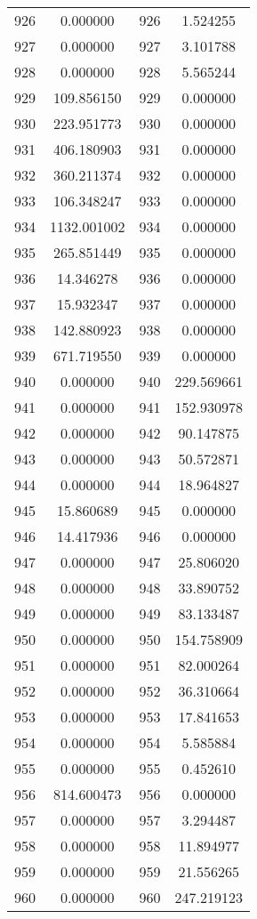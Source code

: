 \documentclass[12pt]{article}
\begin{document}
\begin{longtable}{@{}cccc@{}}
926 & 0.000000 & 926 & 1.524255 \\
927 & 0.000000 & 927 & 3.101788 \\
928 & 0.000000 & 928 & 5.565244 \\
929 & 109.856150 & 929 & 0.000000 \\
930 & 223.951773 & 930 & 0.000000 \\
931 & 406.180903 & 931 & 0.000000 \\
932 & 360.211374 & 932 & 0.000000 \\
933 & 106.348247 & 933 & 0.000000 \\
934 & 1132.001002 & 934 & 0.000000 \\
935 & 265.851449 & 935 & 0.000000 \\
936 & 14.346278 & 936 & 0.000000 \\
937 & 15.932347 & 937 & 0.000000 \\
938 & 142.880923 & 938 & 0.000000 \\
939 & 671.719550 & 939 & 0.000000 \\
940 & 0.000000 & 940 & 229.569661 \\
941 & 0.000000 & 941 & 152.930978 \\
942 & 0.000000 & 942 & 90.147875 \\
943 & 0.000000 & 943 & 50.572871 \\
944 & 0.000000 & 944 & 18.964827 \\
945 & 15.860689 & 945 & 0.000000 \\
946 & 14.417936 & 946 & 0.000000 \\
947 & 0.000000 & 947 & 25.806020 \\
948 & 0.000000 & 948 & 33.890752 \\
949 & 0.000000 & 949 & 83.133487 \\
950 & 0.000000 & 950 & 154.758909 \\
951 & 0.000000 & 951 & 82.000264 \\
952 & 0.000000 & 952 & 36.310664 \\
953 & 0.000000 & 953 & 17.841653 \\
954 & 0.000000 & 954 & 5.585884 \\
955 & 0.000000 & 955 & 0.452610 \\
956 & 814.600473 & 956 & 0.000000 \\
957 & 0.000000 & 957 & 3.294487 \\
958 & 0.000000 & 958 & 11.894977 \\
959 & 0.000000 & 959 & 21.556265 \\
960 & 0.000000 & 960 & 247.219123 \\

\end{longtable}
\end{document}
